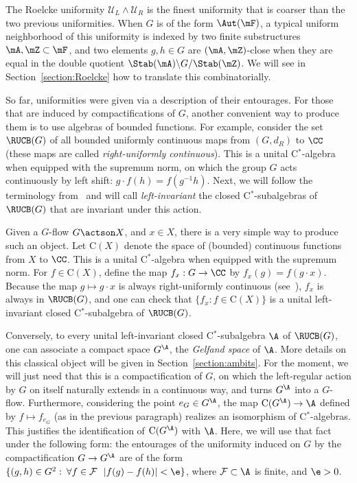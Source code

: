 The Roelcke uniformity $\mathcal U_{L}\wedge\mathcal U_{R}$ is the finest uniformity that is coarser than the two previous uniformities. When $G$ is of the form $\Aut(\mF)$, a typical uniform neighborhood of this uniformity is indexed by two finite substructures $\mA, \mZ \subset \mF$, and two elements $g,h\in G$ are $(\mA,\mZ)$-close when they are equal in the double quotient $\Stab(\mA)\backslash G / \Stab(\mZ)$. We will see in Section~\ref{section:Roelcke} how to translate this combinatorially.

So far, uniformities were given via a description of their entourages. For those that are induced by compactifications of $G$, another convenient way to produce them is to use algebras of bounded functions. For example, consider the set $\RUCB(G)$ of all bounded uniformly continuous maps from $(G,d_{R})$ to $\CC$ (these maps are called \emph{right-uniformly continuous}). This is a unital C$^{*}$-algebra when equipped with the supremum norm, on which the group $G$ acts continuously by left shift: $g\cdot f(h)=f(g^{-1}h)$. Next, we will follow the terminology from~\cite[Chapter~IV, Section~5]{dV} and will call \emph{left-invariant} the closed C$^{*}$-subalgebras of $\RUCB(G)$ that are invariant under this action.

Given a $G$-flow $G\actson X$, and $x\in X$, there is a very simple way to produce such an object. Let $\mathrm C(X)$ denote the space of (bounded) continuous functions from $X$ to $\CC$. This is a unital C$^{*}$-algebra when equipped with the supremum norm. For $f\in \mathrm C(X)$, define the map $f_{x}:G\rightarrow \CC$ by $f_{x}(g)=f(g\cdot x)$. Because the map $g\mapsto g\cdot x$ is always right-uniformly continuous (see~\cite[Lemma~2.15]{Pe}), $f_{x}$ is always in $\RUCB(G)$, and one can check that $\{ f_{x} : f\in \mathrm C(X)\}$ is a unital left-invariant closed C$^{*}$-subalgebra of $\RUCB(G)$.

Conversely, to every unital left-invariant closed C$^{*}$-subalgebra $\A$ of $\RUCB(G)$, one can associate a compact space $G^{\A}$, the \emph{Gelfand space} of $\A$. More details on this classical object will be given in Section~\ref{section:ambits}. For the moment, we will just need that this is a compactification of $G$, on which the left-regular action by $G$ on itself naturally extends in a continuous way, and turns $G^{\A}$ into a $G$-flow. Furthermore, considering the point $e_{G}\in G^{\A}$, the map $\mathrm C(G^{\A})\to\A$ defined by $f\mapsto f_{e_{G}}$ (as in the previous paragraph) realizes an isomorphism of C$^{*}$-algebras. This justifies the identification of $\mathrm C(G^{\A})$ with $\A$. Here, we will use that fact under the following form: the entourages of the uniformity induced on $G$ by the compactification $G\to G^{\A}$ are of the form $\{ (g,h) \in G^{2} :\: \forall f\in \mathcal F \ \ |f(g)-f(h)|<\e\}$, where $\mathcal F\subset \A$ is finite, and $\e >0$.

